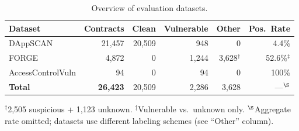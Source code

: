 \begin{table}[t]
\centering
\caption{Overview of evaluation datasets.}
\label{tab:datasets}
\begin{tabular}{lrrrrr}
\hline
\textbf{Dataset} & \textbf{Contracts} & \textbf{Clean} & \textbf{Vulnerable} & \textbf{Other} & \textbf{Pos.\ Rate} \\
\hline
DAppSCAN & 21{,}457 & 20{,}509 & 948 & 0 & 4.4\% \\
FORGE & 4{,}872 & 0 & 1{,}244 & 3{,}628$^\dagger$ & 52.6\%$^\ddagger$ \\
AccessControlVuln & 94 & 0 & 94 & 0 & 100\% \\
\hline
\textbf{Total} & \textbf{26{,}423} & 20{,}509 & 2{,}286 & 3{,}628 & ---$^{\S}$ \\
\hline
\end{tabular}
\vspace{4pt}
{\footnotesize $^\dagger$2{,}505 suspicious + 1{,}123 unknown. $^\ddagger$Vulnerable vs.\ unknown only. $^{\S}$Aggregate rate omitted; datasets use different labeling schemes (see ``Other'' column).}
\end{table}
